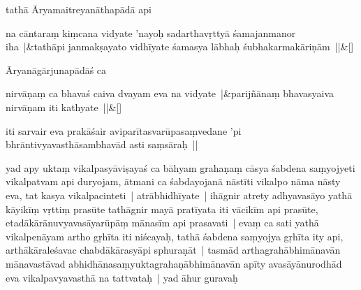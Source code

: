 \documentclass[article,12pt,a4paper]{memoir}%
\newcounter{parCount}
\begin{document}
	  
	  

	  \pstart \leavevmode%
	\label{thakur75-139.5}tathā Āryamaitreyanāthapādā api 
	{}
	\pend%
      
	    
	    \stanza[\smallbreak]
	  na cāntaraṃ kiṃcana vidyate 'nayoḥ sadarthavṛttyā śamajanmanor iha |&tathāpi janmakṣayato vidhīyate śamasya lābhaḥ śubhakarmakāriṇām ||\&[\smallbreak]
	  
	  
	  

	  \pstart \leavevmode%
	\label{thakur75-139.10}Āryanāgārjunapādāś ca 
	{}
	\pend%
      
	    
	    \stanza[\smallbreak]
	  nirvāṇaṃ ca bhavaś caiva dvayam eva na vidyate |&parijñānaṃ bhavasyaiva nirvāṇam iti kathyate ||\&[\smallbreak]
	  
	  
	  

	  \pstart \leavevmode%
	iti sarvair eva prakāśair aviparītasvarūpasaṃvedane 'pi bhrāntivyavasthāsambhavād asti saṃsāraḥ || 
	{}
	\pend%
      

	  \pstart \leavevmode%
	\label{thakur75-139.15}yad apy uktaṃ vikalpasyāviṣayaś ca bāhyam grahaṇaṃ cāsya śabdena saṃyojyeti vikalpatvam api duryojam, ā\label{capv-np-13b-end}tmani ca śabdayojanā nāstīti vikalpo nāma nāsty eva, tat kasya vikalpacinteti | atrābhidhīyate | ihāgnir atrety adhyavasāyo yathā kāyikīṃ vṛttiṃ prasūte tathāgnir mayā pratīyata iti vācikīm api prasūte, etadākārānuvyavasāyarūpāṃ mānasīm api prasavati | evaṃ ca sati yathā vikalpenāyam artho gṛhīta iti niścayaḥ, tathā śabdena saṃyojya gṛhīta ity api, arthākāraleśavac chabdākārasyāpi sphuraṇāt | tasmād arthagrahābhimānavān mānavastāvad abhidhānasaṃyuktagrahaṇābhimānavān apīty avasāyānurodhād eva vikalpavyavasthā na tattvataḥ | yad āhur guravaḥ
	{}
	\pend%
      
\end{document}
